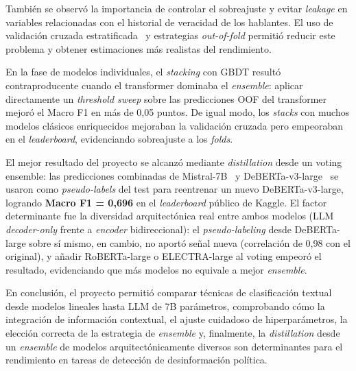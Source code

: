 \documentclass[12pt,a4paper]{article}
\begin{document}
También se observó la importancia de controlar el sobreajuste y evitar \emph{leakage} en variables relacionadas con el historial de veracidad de los hablantes. El uso de validación cruzada estratificada~\cite{sklearn} y estrategias \emph{out-of-fold} permitió reducir este problema y obtener estimaciones más realistas del rendimiento.

En la fase de modelos individuales, el \emph{stacking} con GBDT resultó contraproducente cuando el transformer dominaba el \emph{ensemble}: aplicar directamente un \emph{threshold sweep} sobre las predicciones OOF del transformer mejoró el Macro F1 en más de 0,05 puntos. De igual modo, los \emph{stacks} con muchos modelos clásicos enriquecidos mejoraban la validación cruzada pero empeoraban en el \emph{leaderboard}, evidenciando sobreajuste a los \emph{folds}.

El mejor resultado del proyecto se alcanzó mediante \emph{distillation} desde un voting ensemble: las predicciones combinadas de Mistral-7B~\cite{mistral} y DeBERTa-v3-large~\cite{deberta} se usaron como \emph{pseudo-labels} del test para reentrenar un nuevo DeBERTa-v3-large, logrando \textbf{Macro F1 = 0,696} en el \emph{leaderboard} público de Kaggle. El factor determinante fue la diversidad arquitectónica real entre ambos modelos (LLM \emph{decoder-only} frente a \emph{encoder} bidireccional): el \emph{pseudo-labeling} desde DeBERTa-large sobre sí mismo, en cambio, no aportó señal nueva (correlación de 0,98 con el original), y añadir RoBERTa-large o ELECTRA-large al voting empeoró el resultado, evidenciando que más modelos no equivale a mejor \emph{ensemble}. 

En conclusión, el proyecto permitió comparar técnicas de clasificación textual desde modelos lineales hasta LLM de 7B parámetros, comprobando cómo la integración de información contextual, el ajuste cuidadoso de hiperparámetros, la elección correcta de la estrategia de \emph{ensemble} y, finalmente, la \emph{distillation} desde un \emph{ensemble} de modelos arquitectónicamente diversos son determinantes para el rendimiento en tareas de detección de desinformación política.

\newpage


\end{document}
